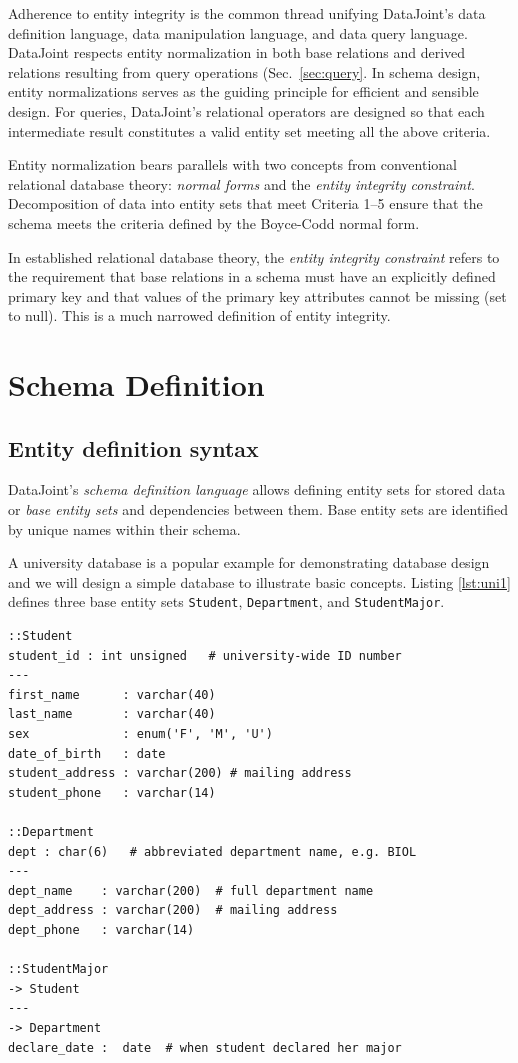 \documentclass[letter,10pt]{article}
\newcommand{\datajoint}{DataJoint\xspace}
\begin{document}
Adherence to entity integrity is the common thread unifying \datajoint's data definition language, data manipulation language, and data query language. 
\datajoint respects entity normalization in both base relations and derived relations resulting from query operations (Sec.\ \ref{sec:query}.  
In schema design, entity normalizations serves as the guiding principle for efficient and sensible design.
For queries, \datajoint's relational operators are designed so that each intermediate result constitutes a valid entity set meeting all the above criteria.

Entity normalization bears parallels with two concepts from conventional relational database theory: \emph{normal forms} and the \emph{entity integrity constraint}.
Decomposition  of data into entity sets that meet Criteria 1--5 ensure that the schema meets the criteria defined by the Boyce-Codd normal form.

In established relational database theory, the \emph{entity integrity constraint} refers to the requirement that base relations in a schema  must have an explicitly defined primary key and that values of the primary key attributes cannot be missing (set to null).  
This is a much narrowed definition of entity integrity.

\section{Schema Definition}\label{sec:def1}
\subsection{Entity definition syntax}
\datajoint's  \emph{schema definition language} allows defining entity sets for stored data or \emph{base entity sets} and dependencies between them. 
Base entity sets are identified by unique names within their schema. 

A university database is a popular example for demonstrating database design and we will design a simple database to illustrate basic concepts. 
Listing \ref{lst:uni1} defines three base entity sets {\tt Student}, {\tt Department}, and {\tt StudentMajor}.

\begin{lstfloat*}
\begin{lstlisting}[language=dj,caption={University database schema definition (Part 1).},label={lst:uni1}]
::Student     
student_id : int unsigned   # university-wide ID number 
---
first_name      : varchar(40)
last_name       : varchar(40)
sex             : enum('F', 'M', 'U')
date_of_birth   : date
student_address : varchar(200) # mailing address
student_phone   : varchar(14) 

::Department 
dept : char(6)   # abbreviated department name, e.g. BIOL
---
dept_name    : varchar(200)  # full department name
dept_address : varchar(200)  # mailing address
dept_phone   : varchar(14)  

::StudentMajor
-> Student
---
-> Department
declare_date :  date  # when student declared her major  
\end{lstlisting}
\end{lstfloat*}
\end{document}
